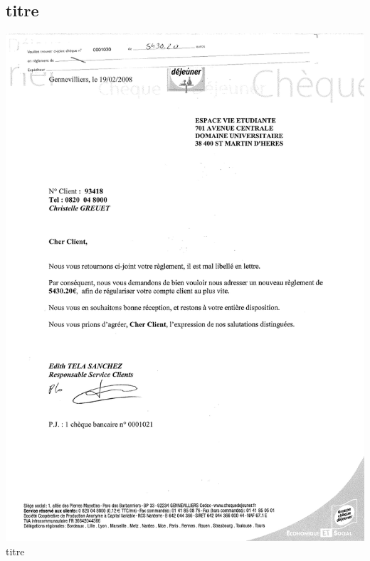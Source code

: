 \subsection{titre}
\begin{center}
\includegraphics[scale=0.6]{annexes/images/chequedejeuner_erreur.pdf} \\
titre
\end{center}
